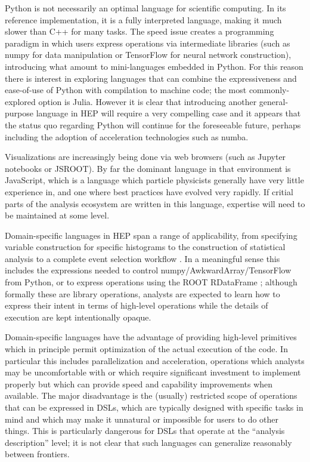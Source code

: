 Python is not necessarily an optimal language for scientific computing. In its reference implementation, it is a fully interpreted language, making it much slower than C++ for many tasks. The speed issue creates a programming paradigm in which users express operations via intermediate libraries (such as numpy for data manipulation or TensorFlow for neural network construction), introducing what amount to mini-languages embedded in Python. For this reason there is interest in exploring languages that can combine the expressiveness and ease-of-use of Python with compilation to machine code; the most commonly-explored option is Julia. However it is clear that introducing another general-purpose language in HEP will require a very compelling case and it appears that the status quo regarding Python will continue for the foreseeable future, perhaps including the adoption of acceleration technologies such as numba.

Visualizations are increasingly being done via web browsers (such as Jupyter notebooks or JSROOT). By far the dominant language in that environment is JavaScript, which is a language which particle physicists generally have very little experience in, and one where best practices have evolved very rapidly. If critial parts of the analysis ecosystem are written in this language, expertise will need to be maintained at some level.

Domain-specific languages in HEP span a range of applicability, from specifying variable construction for specific histograms to the construction of statistical analysis to a complete event selection workflow \cite{Prosper:2022lnf}. In a meaningful sense this includes the expressions needed to control numpy/AwkwardArray/TensorFlow from Python, or to express operations using the ROOT RDataFrame \cite{Piparo:2019xdy}; although formally these are library operations, analysts are expected to learn how to express their intent in terms of high-level operations while the details of execution are kept intentionally opaque. 

Domain-specific languages have the advantage of providing high-level primitives which in principle permit optimization of the actual execution of the code. In particular this includes parallelization and acceleration, operations which analysts may be uncomfortable with or which require significant investment to implement properly but which can provide speed and capability improvements when available. The major disadvantage is the (usually) restricted scope of operations that can be expressed in DSLs, which are typically designed with specific tasks in mind and which may make it unnatural or impossible for users to do other things. This is particularly dangerous for DSLs that operate at the ``analysis description'' level; it is not clear that such languages can generalize reasonably between frontiers.

